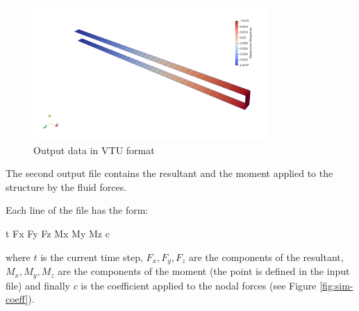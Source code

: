 \begin{figure}[htbp!]
	\centering
	\includegraphics[width=0.8\textwidth]{images/vtk_disp.png}
	\caption{Output data in VTU format}
	\label{fig:vtk-out}
\end{figure}

The second output file contains the resultant and the moment applied to the structure by the fluid forces.

Each line of the file has the form:
\begin{verbatim*}
t Fx Fy Fz Mx My Mz c
\end{verbatim*}

where $t$ is the current time step, $F_x, F_y, F_z$ are the components of the resultant, $M_x, M_y, M_z$ are the components of the moment (the point is defined in the input file) and finally $c$ is the coefficient applied to the nodal forces (see Figure \ref{fig:sim-coeff}).